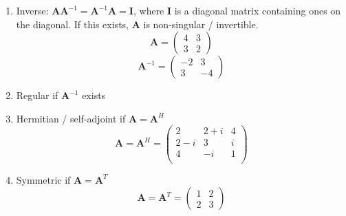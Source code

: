 \documentclass[12pt]{article}
\newcommand{\ve}[1]{\ensuremath{\mathbf{#1}}}
\begin{document}
\begin{enumerate}
\item Inverse: $\ve{AA}^{-1} = \ve{A}^{-1}\ve{A} = \ve{I}$, where $\ve{I}$ is a diagonal matrix containing ones on the diagonal. If this exists, $\ve{A}$ is non-singular / invertible. 
\renewcommand{\aaa}{4}
\renewcommand{\aab}{3}
\renewcommand{\aba}{3}
\renewcommand{\abb}{2}
%
\begin{equation}
\ve{A} = \begin{pmatrix}
   \aaa & \aab \\
   \aba & \abb 
\end{pmatrix} \nonumber
\end{equation}
%
\renewcommand{\aaa}{-2}
\renewcommand{\abb}{-4}
%
\begin{equation}
\ve{A}^{-1} = \begin{pmatrix}
   \aaa & \aab \\
   \aba & \abb 
\end{pmatrix} \nonumber
\end{equation}


\item Regular if $\ve{A}^{-1}$ exists

\item Hermitian / self-adjoint if $\ve{A} = \ve{A}^H$
%
\renewcommand{\aaa}{2}
\renewcommand{\aab}{2+i}
\newcommand{\aac}{4}
\renewcommand{\aba}{2-i}
\renewcommand{\abb}{3}
\newcommand{\abc}{i}
\renewcommand{\aca}{4}
\renewcommand{\acb}{-i}
\newcommand{\acc}{1}
%
\begin{equation}
\ve{A} = \ve{A}^H= \begin{pmatrix}
   \aaa & \aab & \aac \\
   \aba & \abb & \abc \\
   \aca & \acb & \acc \\
\end{pmatrix} \nonumber
\end{equation}

\item Symmetric if $\ve{A} = \ve{A}^T$
%
\renewcommand{\aaa}{1}
\renewcommand{\aab}{2}
\renewcommand{\aba}{2}
\renewcommand{\abb}{3}
%
\begin{equation}
\ve{A} = \ve{A}^T = \begin{pmatrix}
   \aaa & \aab \\
   \aba & \abb 
\end{pmatrix} \nonumber
\end{equation}


\end{enumerate}
\end{document}
